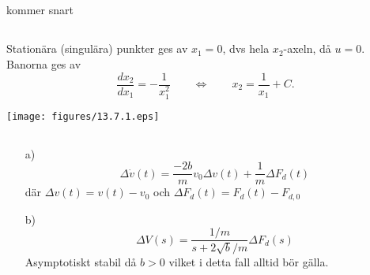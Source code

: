 \subsection{} kommer snart


\subsection{}
 Stationära (singulära) punkter ges av $x_1 = 0$, dvs hela
  $x_2$-axeln, då $u=0$. Banorna ges av 
  \begin{displaymath}
    \frac{d x_2}{d x_1} = -\frac{1}{x_1^2}
    \qquad \Leftrightarrow \qquad
    x_2 = \frac{1}{x_1} + C.
  \end{displaymath}
\begin{center}\texttt{[image: figures/13.7.1.eps]}\end{center}



\subsection{}
\begin{itemize}
\item[a)] 
\begin{equation}
\Delta \dot{v}(t)=\frac{-2b}{m}v_0\Delta v(t)+\frac{1}{m}\Delta F_d(t)
\end{equation}
där $\Delta v(t)=v(t)-v_0$ och $\Delta F_d(t)=F_d(t)-F_{d,0}$

\item[b)]
\begin{equation}
\Delta V(s)=\frac{1/m}{s+2\sqrt{b}/m}\Delta F_d(s)
\end{equation}
Asymptotiskt stabil då $b>0$ vilket i detta fall alltid bör gälla.
\end{itemize}


